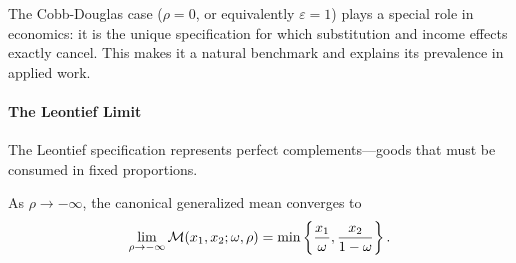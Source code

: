 \begin{calloutimportant}
The Cobb-Douglas case ($\rho = 0$, or equivalently $\varepsilon = 1$) plays a special role in economics: it is the unique specification for which substitution and income effects exactly cancel. This makes it a natural benchmark and explains its prevalence in applied work.
\end{calloutimportant}

\paragraph{The Leontief Limit}

The Leontief specification represents perfect complements---goods that must be consumed in fixed proportions.

\begin{proposition}
\label{prop:leontief}
As $\rho \to -\infty$, the canonical generalized mean converges to
\begin{equation}
\label{eq:leontief}
\lim_{\rho \to -\infty} \mathcal{M}(x_1, x_2; \omega, \rho) = \min\left\{ \frac{x_1}{\omega}, \frac{x_2}{1-\omega} \right\}.
\end{equation}
\end{proposition}

